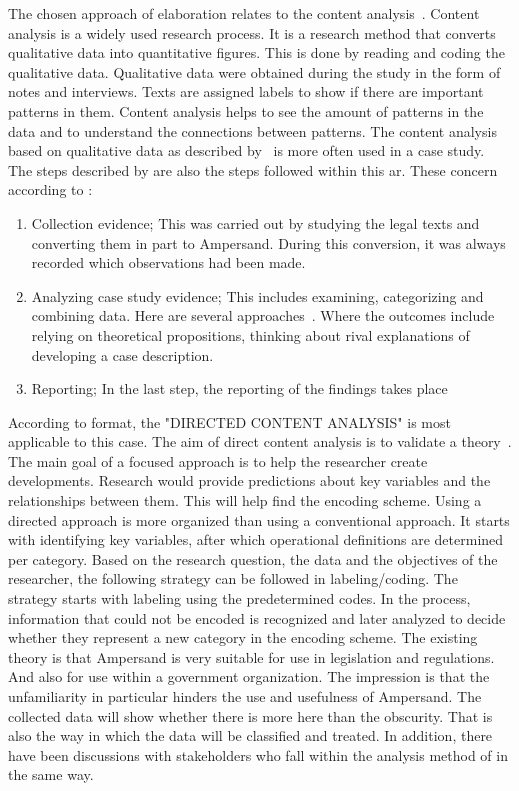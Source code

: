 The chosen approach of elaboration relates to the content analysis~\citep{kohlbacher_use_2006}.
Content analysis is a widely used research process.
It is a research method that converts qualitative data into quantitative figures.
This is done by reading and coding the qualitative data.
Qualitative data were obtained during the study in the form of notes and interviews.
Texts are assigned labels to show if there are important patterns in them.
Content analysis helps to see the amount of patterns in the data and to understand the connections between patterns.
The content analysis based on qualitative data as described by~\cite{kohlbacher_use_2006} is more often used in a case study.
The steps described by \cite{kohlbacher_use_2006} are also the steps followed within this \acrshort{ar}.
These concern according to \cite{kohlbacher_use_2006}:
\begin{enumerate}
    \item Collection evidence;
    \newline This was carried out by studying the legal texts and converting them in part to Ampersand.
    During this conversion, it was always recorded which observations had been made.
    \item Analyzing case study evidence;
    \newline This includes examining, categorizing and combining data.
    Here are several approaches~\citep{hsieh_three_2005}.
    Where the outcomes include relying on theoretical propositions, thinking about rival explanations of developing a case description.
    \item Reporting;
    \newline In the last step, the reporting of the findings takes place
\end{enumerate}
According to \cite{hsieh_three_2005} format, the "DIRECTED CONTENT ANALYSIS" is most applicable to this case.
The aim of direct content analysis is to validate a theory~\citep{hsieh_three_2005}.
The main goal of a focused approach is to help the researcher create developments.
Research would provide predictions about key variables and the relationships between them.
This will help find the encoding scheme.
Using a directed approach is more organized than using a conventional approach.
It starts with identifying key variables, after which operational definitions are determined per category.
Based on the research question, the data and the objectives of the researcher, the following strategy can be followed in labeling/coding.
The strategy starts with labeling using the predetermined codes.
In the process, information that could not be encoded is recognized and later analyzed to decide whether they represent a new category in the encoding scheme.
The existing theory is that Ampersand is very suitable for use in legislation and regulations.
And also for use within a government organization.
The impression is that the unfamiliarity in particular hinders the use and usefulness of Ampersand.
The collected data will show whether there is more here than the obscurity.
That is also the way in which the data will be classified and treated.
In addition, there have been discussions with stakeholders who fall within the analysis method of \cite{hsieh_three_2005} in the same way.

